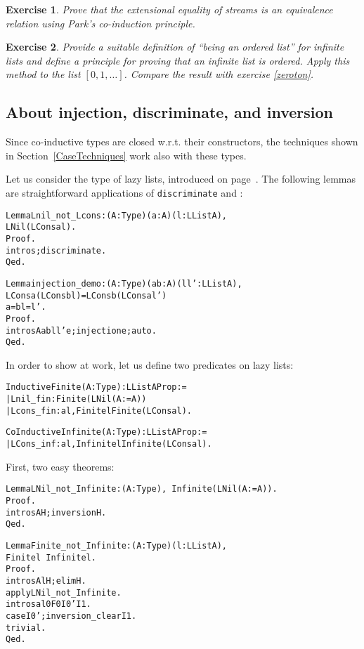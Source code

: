 \documentclass[11pt]{article}
\newtheorem{exercise}{Exercise}[section]
\begin{document}
\begin{exercise}
Prove that the extensional equality of streams is an equivalence relation
using Park's co-induction principle.
\end{exercise}


\begin{exercise}
Provide a suitable definition of ``being an ordered list'' for infinite lists
and define a principle for proving that an infinite list is ordered. Apply
this method to the list $[0,1,\ldots ]$. Compare the result with 
exercise \ref{zeroton}.
\end{exercise}

\subsection{About injection, discriminate, and inversion}
Since co-inductive types are closed w.r.t. their constructors,
the techniques shown in Section~\ref{CaseTechniques} work also 
with these types.

Let us consider the type of lazy lists, introduced on page~\pageref{CoInduction}.
The following lemmas are straightforward applications
 of \texttt{discriminate} and :

\begin{alltt}
Lemma Lnil_not_Lcons : {\prodsym} (A:Type)(a:A)(l:LList A),
                               LNil {\coqdiff} (LCons a l).
Proof.
 intros;discriminate.
Qed.

Lemma injection_demo : {\prodsym} (A:Type)(a b : A)(l l': LList A),
                  LCons a (LCons b l) = LCons b (LCons a l') {\arrow}
                  a = b {\coqand} l = l'.
Proof.
 intros A a b l l' e; injection e; auto.
Qed.

\end{alltt}

In order to show  at work, let us define
two predicates on lazy lists:

\begin{alltt}
Inductive Finite (A:Type) : LList A {\arrow} Prop :=
|  Lnil_fin : Finite (LNil (A:=A))
|  Lcons_fin : {\prodsym} a l, Finite l {\arrow} Finite (LCons a l).

CoInductive Infinite  (A:Type) : LList A {\arrow} Prop :=
| LCons_inf : {\prodsym} a l, Infinite l {\arrow} Infinite (LCons a l).
\end{alltt}

\noindent
First, two easy theorems:
\begin{alltt}
Lemma LNil_not_Infinite : {\prodsym} (A:Type), ~ Infinite (LNil (A:=A)).
Proof.
  intros A H;inversion H.
Qed.

Lemma Finite_not_Infinite : {\prodsym} (A:Type)(l:LList A),
                                Finite l {\arrow} ~ Infinite l.
Proof.
 intros A l H; elim H.
 apply LNil_not_Infinite.
 intros a l0 F0 I0' I1.
 case I0'; inversion_clear I1.
 trivial.
Qed.
\end{alltt}
\end{document}
